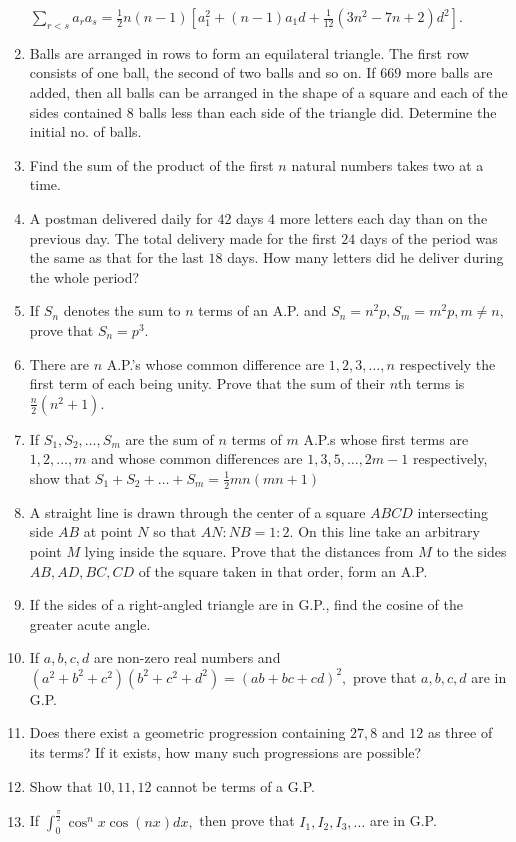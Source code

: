 \begin{enumerate}
  $\sum_{r < s}a_ra_s = \frac{1}{2}n(n - 1)[a_1^2 + (n - 1)a_1d + \frac{1}{12}(3n^2 - 7n + 2)d^2]$.
\item Balls are arranged in rows to form an equilateral triangle. The first row consists of one ball, the second of two
  balls and so on. If $669$ more balls are added, then all balls can be arranged in the shape of a square and each of the sides
  contained $8$ balls less than each side of the triangle did. Determine the initial no. of balls.
\item Find the sum of the  product of the first $n$ natural numbers takes two at a time.
\item A postman delivered daily for $42$ days $4$ more letters each day than on the previous day. The total delivery made
  for the first $24$ days of the period was the same as that for the last $18$ days. How many letters did he deliver during the
  whole period?
\item If $S_n$ denotes the sum to $n$ terms of an A.P. and $S_n = n^2p, S_m = m^2p, m\neq n,$ prove that $S_n = p^3$.
\item There are $n$ A.P.'s whose common difference are $1, 2, 3, \ldots, n$ respectively the first term of each being
  unity. Prove that the sum of their $n$th terms is $\frac{n}{2}(n^2 + 1)$.
\item If $S_1, S_2, \ldots, S_m$ are the sum of $n$ terms of $m$ A.P.s whose first terms are $1, 2, \ldots, m$ and whose
  common differences are $1, 3, 5, \ldots, 2m - 1$ respectively, show that $S_1 + S_2 + \ldots + S_m = \frac{1}{2}mn(mn + 1)$
\item A straight line is drawn through the center of a square $ABCD$ intersecting side $AB$ at point $N$ so that $AN:NB =
  1:2.$ On this line take an arbitrary point $M$ lying inside the square. Prove that the distances from $M$ to the sides $AB, AD,
  BC, CD$ of the square taken in that order, form an A.P.
\item If the sides of a right-angled triangle are in G.P., find the cosine of the greater acute angle.
\item If $a, b, c, d$ are non-zero real numbers and $(a^2 + b^2 + c^2)(b^2 + c^2 + d^2) = (ab + bc + cd)^2,$ prove that
  $a, b, c, d$ are in G.P.
\item Does there exist a geometric progression containing $27, 8$ and $12$ as three of its terms? If it exists, how many
  such progressions are possible?
\item Show that $10, 11, 12$ cannot be terms of a G.P.
\item If $\displaystyle\int_0^{\frac{\pi}{2}}\cos^nx\cos(nx)dx,$ then prove that $I_1, I_2, I_3, \ldots$ are in G.P.

\end{enumerate}
